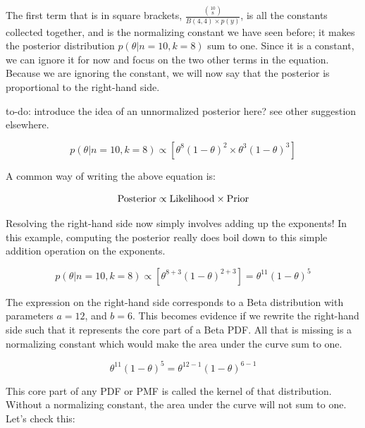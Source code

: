 \documentclass[12pt,]{krantz}
\newenvironment{Shaded}{\begin{snugshade}}{\end{snugshade}}
\newcommand{\ControlFlowTok}[1]{\textcolor[rgb]{0.13,0.29,0.53}{\textbf{#1}}}
\newcommand{\DataTypeTok}[1]{\textcolor[rgb]{0.13,0.29,0.53}{#1}}
\newcommand{\DecValTok}[1]{\textcolor[rgb]{0.00,0.00,0.81}{#1}}
\newcommand{\KeywordTok}[1]{\textcolor[rgb]{0.13,0.29,0.53}{\textbf{#1}}}
\newcommand{\NormalTok}[1]{#1}
\newcommand{\OperatorTok}[1]{\textcolor[rgb]{0.81,0.36,0.00}{\textbf{#1}}}
\newcommand{\StringTok}[1]{\textcolor[rgb]{0.31,0.60,0.02}{#1}}
\theoremstyle{definition}
\theoremstyle{definition}
\theoremstyle{definition}
\theoremstyle{remark}
\let\BeginKnitrBlock\begin \let\EndKnitrBlock\end
\begin{document}
The first term that is in square brackets, \(\frac{\binom{10}{8}}{B(4,4)\times p(y)}\), is all the constants collected together, and is the normalizing constant we have seen before; it makes the posterior distribution \(p(\theta|n=10,k=8)\) sum to one. Since it is a constant, we can ignore it for now and focus on the two other terms in the equation. Because we are ignoring the constant, we will now say that the posterior is proportional to the right-hand side.

\BeginKnitrBlock{rmdnote}
to-do: introduce the idea of an unnormalized posterior here? see other suggestion elsewhere.
\EndKnitrBlock{rmdnote}

\begin{equation}
p(\theta|n=10,k=8) \propto   [\theta^8 (1-\theta)^{2} \times \theta^{3} (1-\theta)^{3} ]
\label{eq:betaunpost3}
\end{equation}

A common way of writing the above equation is:

\begin{equation}
\hbox{Posterior} \propto \hbox{Likelihood} \times \hbox{Prior}
\end{equation}

Resolving the right-hand side now simply involves adding up the exponents! In this example, computing the posterior really does boil down to this simple addition operation on the exponents.

\begin{equation}
p(\theta|n=10,k=8) \propto   [\theta^{8+3} (1-\theta)^{2+3}] = \theta^{11} (1-\theta)^{5}
\label{eq:betaunpost4}
\end{equation}

The expression on the right-hand side corresponds to a Beta distribution with parameters \(a=12\), and \(b=6\). This becomes evidence if we rewrite the right-hand side such that it represents the core part of a Beta PDF. All that is missing is a normalizing constant which would make the area under the curve sum to one.

\begin{equation}
\theta^{11} (1-\theta)^{5} = \theta^{12-1} (1-\theta)^{6-1} 
\end{equation}

This core part of any PDF or PMF is called the kernel of that distribution. Without a normalizing constant, the area under the curve will not sum to one. Let's check this:

\begin{Shaded}
\end{Shaded}
\end{document}
